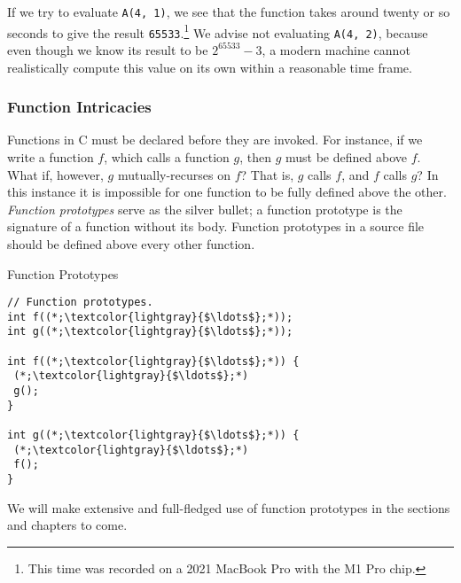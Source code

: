 If we try to evaluate \texttt{A(4, 1)}, we see that the function takes around twenty or so seconds to give the result \texttt{65533}.\footnote{This time was recorded on a 2021 MacBook Pro with the M1 Pro chip.} We advise not evaluating \texttt{A(4, 2)}, because even though we know its result to be $2^{65533}-3$, a modern machine cannot realistically compute this value on its own within a reasonable time frame.

\subsubsection*{Function Intricacies}
Functions in C must be declared before they are invoked. For instance, if we write a function $f$, which calls a function $g$, then $g$ must be defined above $f$. What if, however, $g$ mutually-recurses on $f$? That is, $g$ calls $f$, and $f$ calls $g$? In this instance it is impossible for one function to be fully defined above the other. \textit{Function prototypes} serve as the silver bullet; a function prototype is the signature of a function without its body. Function prototypes in a source file should be defined above every other function.

\begin{cl}[main.c]{Function Prototypes}
\begin{lstlisting}[language=MyC]
// Function prototypes.
int f((*;\textcolor{lightgray}{$\ldots$};*));
int g((*;\textcolor{lightgray}{$\ldots$};*));

int f((*;\textcolor{lightgray}{$\ldots$};*)) {
 (*;\textcolor{lightgray}{$\ldots$};*)
 g();
}

int g((*;\textcolor{lightgray}{$\ldots$};*)) {
 (*;\textcolor{lightgray}{$\ldots$};*)
 f();
}
\end{lstlisting}
\end{cl}

We will make extensive and full-fledged use of function prototypes in the sections and chapters to come.

